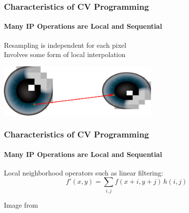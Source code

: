 \documentclass[xetex,professionalfont]{beamer}
\begin{document}

\begin{frame}
\frametitle{Characteristics of CV Programming}
\framesubtitle{Many IP Operations are Local and Sequential}

Resampling is independent for each pixel\\
Involves some form of local interpolation

\bigskip
\begin{center}
	\includegraphics[width=8cm]{figures/resampling.png}
\end{center}

\end{frame}


\begin{frame}
\frametitle{Characteristics of CV Programming}
\framesubtitle{Many IP Operations are Local and Sequential}

Local neighborhood operators such as linear filtering:
\[
 f'(x,y)=\sum_{i,j}f(x+i,y+j)\,h(i,j)
\]

\medskip
\begin{center}
	{\centering Image from \cite{prince12}}
\end{center}

\end{frame}

\end{document}

